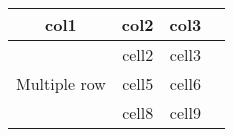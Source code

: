 
\usepackage{multirow}
\begin{center}
\begin{tabular}{ |c|c|c|c| } 
\hline
col1 & col2 & col3 \\
\hline
\multirow{3}{4em}{Multiple row} & cell2 & cell3 \\ 
& cell5 & cell6 \\ 
& cell8 & cell9 \\ 
\hline
\end{tabular}
\end{center}


